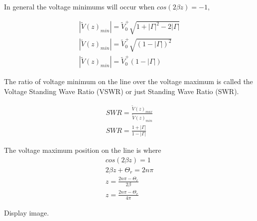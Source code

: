 \documentclass{ximera}
\begin{document}
\begin{itemize}
In general the voltage minimums will occur when
$cos(2 \beta z)=-1$,



\begin{eqnarray}
|\tilde{V}(z)_{min}|=\tilde{V}_0^+\sqrt{1+|\Gamma|^2-2 |\Gamma|} \nonumber  \\
|\tilde{V}(z)_{min}| =\tilde{V}_0^+\sqrt{(1-|\Gamma|)^2}  \nonumber \\
|\tilde{V}(z)_{min}| =\tilde{V}_0^+ (1-|\Gamma|) 
\end{eqnarray}

The ratio of voltage minimum on the line over the voltage maximum is
called the Voltage Standing Wave Ratio (VSWR) or just Standing Wave
Ratio (SWR).

\begin{eqnarray}
SWR=\frac{\tilde{V}(z)_{max}}{ \tilde{V}(z)_{min}} \nonumber \\
SWR=\frac{1+|\Gamma|}{1-|\Gamma|}
\end{eqnarray}

The voltage maximum position on the line is where
\begin{eqnarray}
cos(2 \beta z)=1 \nonumber \\
2 \beta z + \Theta_r = 2 n \pi \nonumber \\
z =\frac{ 2 n \pi -\Theta_r }{ 2 \beta} \nonumber \\
z=\frac{ 2 n \pi -\Theta_r }{ 4 \pi}
\end{eqnarray}



\end{itemize}




































  Display image.
\begin{image}  
\end{image} 
\end{document}
